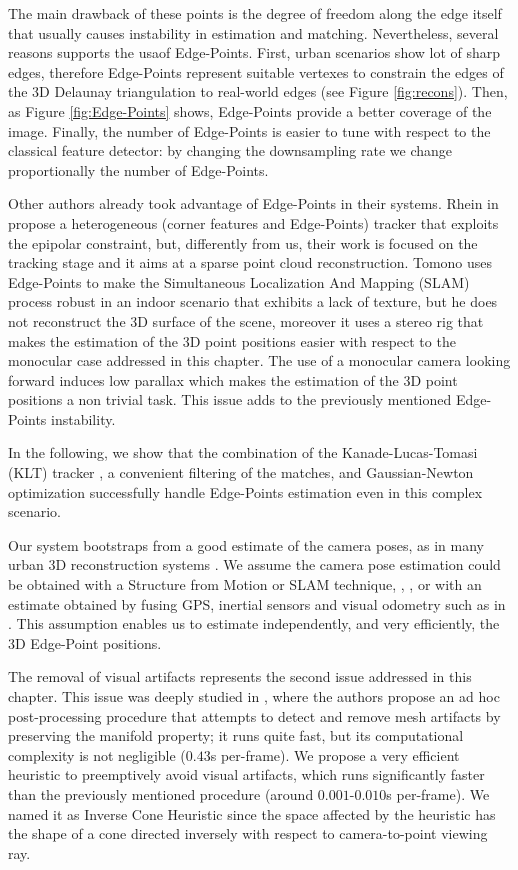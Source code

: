 The main drawback of these points is the degree of freedom along the edge itself that usually causes instability in estimation and matching.
Nevertheless, several reasons supports the usaof Edge-Points.
First, urban scenarios show lot of sharp edges, therefore Edge-Points represent suitable vertexes to constrain the edges of the 3D Delaunay triangulation to real-world edges (see Figure \ref{fig:recons}). 
Then, as Figure \ref{fig:Edge-Points} shows, Edge-Points provide a better coverage of the image.
Finally, the number of Edge-Points is easier to tune with respect to the classical feature detector: by changing the downsampling rate we change proportionally the number of Edge-Points.

Other authors \cite{Rhein_et_al13, Tomono09} already took advantage of Edge-Points in their systems. Rhein \etal in \cite{Rhein_et_al13} propose a heterogeneous (corner features and Edge-Points) tracker that exploits the epipolar constraint, but, differently from us, their work is focused on the tracking stage and it aims at a sparse point cloud reconstruction.
Tomono \cite{Tomono09}  uses Edge-Points to make  the Simultaneous Localization And Mapping (SLAM) process robust in an indoor scenario that exhibits a lack of texture, but he does not reconstruct the 3D surface of the scene, moreover it uses a stereo rig that makes the estimation of the 3D point positions easier with respect to the monocular case addressed in this chapter.
The use of a monocular camera looking forward induces low parallax which makes  the estimation of the 3D point positions a non trivial task. This issue adds to the previously mentioned Edge-Points instability. 

In the following, we show that the combination of the  Kanade-Lucas-Tomasi (KLT) tracker \cite{Lucas_Kanade81}, a convenient filtering of the matches, and Gaussian-Newton optimization successfully handle Edge-Points estimation even in this complex scenario. 

Our system bootstraps from a good estimate of the camera poses, as in many urban 3D reconstruction systems \cite{ pollefeys_et_al_08,cornelis_et_al08}. 
We assume the camera pose estimation could be obtained with a Structure from Motion or SLAM technique, \eg, \cite{Snavely_et_al06},  or with an estimate obtained by fusing GPS, inertial sensors and visual odometry such as in \cite{Cucci_Matteucci14}.
This assumption enables us to estimate independently, and very efficiently, the 3D Edge-Point positions.

The removal of visual artifacts represents the second issue addressed in this chapter.
This issue was deeply studied in \cite{litvinov_Lhiuller14}, where the authors propose an ad hoc post-processing procedure that attempts to detect and remove mesh artifacts by preserving the manifold property; it runs quite fast, but its computational complexity is not negligible ($0.43$s per-frame).  
We propose a very efficient heuristic to preemptively avoid visual artifacts, which runs significantly faster than the previously mentioned procedure (around $0.001$-$0.010$s per-frame). 
We named it as Inverse Cone Heuristic since the space affected by the heuristic has the shape of a cone directed inversely with respect to camera-to-point viewing ray.


